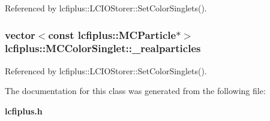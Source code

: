 Referenced by lcfiplus\-::\-L\-C\-I\-O\-Storer\-::\-Set\-Color\-Singlets().

\subsubsection[{\-\_\-realparticles}]{\setlength{\rightskip}{0pt plus 5cm}vector$<$const {\bf lcfiplus\-::\-M\-C\-Particle}$\ast$$>$ lcfiplus\-::\-M\-C\-Color\-Singlet\-::\-\_\-realparticles}\label{classlcfiplus_1_1MCColorSinglet_ac1c26812e4cc9cc46006f3284a65b3ab}


Referenced by lcfiplus\-::\-L\-C\-I\-O\-Storer\-::\-Set\-Color\-Singlets().



The documentation for this class was generated from the following file\-:\begin{DoxyCompactItemize}
\item 
{\bf lcfiplus.\-h}\end{DoxyCompactItemize}
